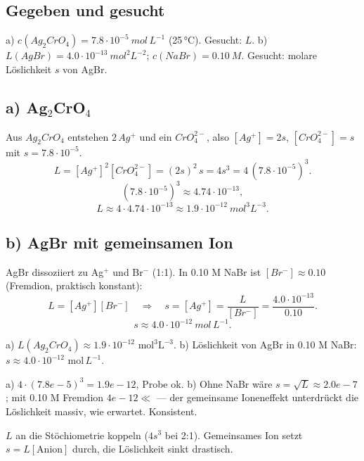 
\subsection*{Gegeben und gesucht}
a) $c(Ag_2CrO_4)=7.8\cdot10^{-5}\ mol\,L^{-1}$ (25\,°C). Gesucht: $L$.
b) $L(AgBr)=4.0\cdot10^{-13}\ mol^2L^{-2}$; $c(NaBr)=0.10\ M$. Gesucht:
molare Löslichkeit $s$ von AgBr.

\subsection*{a) Ag$_2$CrO$_4$}
Aus $Ag_2CrO_4$ entstehen $2\,Ag^+$ und ein $CrO_4^{2-}$, also
$[Ag^+]=2s$, $[CrO_4^{2-}]=s$ mit $s=7.8\cdot10^{-5}$.
\[
  L = [Ag^+]^2[CrO_4^{2-}] = (2s)^2\,s = 4s^3
    = 4\,(7.8\cdot10^{-5})^3 .
\]
\[
  (7.8\cdot10^{-5})^3 \approx 4.74\cdot10^{-13},
\]
\[
  L \approx 4\cdot4.74\cdot10^{-13} \approx 1.9\cdot10^{-12}\ mol^3L^{-3}.
\]

\subsection*{b) AgBr mit gemeinsamen Ion}
AgBr dissoziiert zu Ag$^+$ und Br$^-$ (1:1). In 0.10 M NaBr ist
$[Br^-]\approx0.10$ (Fremdion, praktisch konstant):
\[
  L = [Ag^+][Br^-]\quad\Rightarrow\quad
  s = [Ag^+] = \frac{L}{[Br^-]} = \frac{4.0\cdot10^{-13}}{0.10}.
\]
\[
  s \approx 4.0\cdot10^{-12}\ mol\,L^{-1}.
\]

\begin{ergebnis}
a) $L(Ag_2CrO_4)\approx1.9\cdot10^{-12}$
$\mathrm{mol^3L^{-3}}$.
b) Löslichkeit von AgBr in 0.10 M NaBr: $s\approx4.0\cdot10^{-12}$
mol$\,L^{-1}$.
\end{ergebnis}

\begin{kontrolle}
a) $4\cdot(7.8e{-}5)^3 = 1.9e{-}12$, Probe ok. b) Ohne NaBr wäre
$s=\sqrt{L}\approx2.0e{-}7$; mit 0.10 M Fremdion $4e{-}12\ll$ --- der
gemeinsame Ioneneffekt unterdrückt die Löslichkeit massiv, wie erwartet.
Konsistent.
\end{kontrolle}

\begin{merksatz}
$L$ an die Stöchiometrie koppeln ($4s^3$ bei 2:1). Gemeinsames Ion setzt
$s = L[\text{Anion}]$ durch, die Löslichkeit sinkt drastisch.
\end{merksatz}

